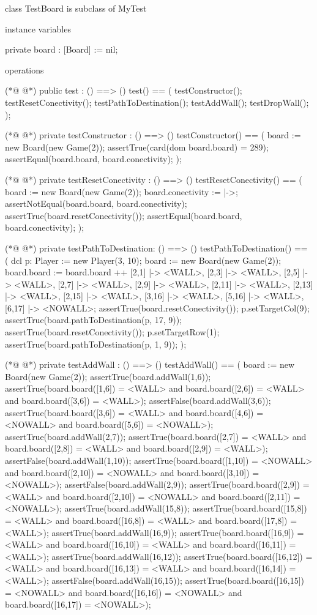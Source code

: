 \begin{vdmpp}[breaklines=true]
class TestBoard is subclass of MyTest

instance variables

 private board : [Board] := nil;
 
operations

(*@
\label{test:9}
@*)
 public test : () ==> ()
 test() ==
 (
  testConstructor();
  testResetConectivity();
  testPathToDestination();
  testAddWall();
  testDropWall();
 );
 
(*@
\label{testConstructor:19}
@*)
 private testConstructor : () ==> ()
 testConstructor() ==
 (
  board := new Board(new Game(2));
  assertTrue(card(dom board.board) = 289);
  assertEqual(board.board, board.conectivity);
 );

(*@
\label{testResetConectivity:27}
@*)
 private testResetConectivity : () ==> ()
 testResetConectivity() ==
 (
  board := new Board(new Game(2));
  board.conectivity := {|->};
  assertNotEqual(board.board, board.conectivity);
  assertTrue(board.resetConectivity());
  assertEqual(board.board, board.conectivity);
 );
 
(*@
\label{testPathToDestination:37}
@*)
 private testPathToDestination: () ==> ()
 testPathToDestination() ==
 (
  dcl
  p: Player := new Player(3, 10);
  board := new Board(new Game(2));
  board.board := board.board ++ {[2,1] |-> <WALL>, [2,3] |-> <WALL>, [2,5] |-> <WALL>, [2,7] |-> <WALL>, [2,9] |-> <WALL>, [2,11] |-> <WALL>, [2,13] |-> <WALL>, [2,15] |-> <WALL>, [3,16] |-> <WALL>, [5,16] |-> <WALL>, [6,17] |-> <NOWALL>};
  assertTrue(board.resetConectivity());
  p.setTargetCol(9);
  assertTrue(board.pathToDestination(p, 17, 9));
  assertTrue(board.resetConectivity());
  p.setTargetRow(1);
  assertTrue(board.pathToDestination(p, 1, 9));
 );
 
(*@
\label{testAddWall:52}
@*)
 private testAddWall : () ==> ()
 testAddWall() ==
 (
  board := new Board(new Game(2));
  assertTrue(board.addWall(1,6));
  assertTrue(board.board([1,6]) = <WALL> and board.board([2,6]) = <WALL> and board.board([3,6]) = <WALL>);
  assertFalse(board.addWall(3,6));
  assertTrue(board.board([3,6]) = <WALL> and board.board([4,6]) = <NOWALL> and board.board([5,6]) = <NOWALL>);
  assertTrue(board.addWall(2,7));
  assertTrue(board.board([2,7]) = <WALL> and board.board([2,8]) = <WALL> and board.board([2,9]) = <WALL>);
  assertFalse(board.addWall(1,10));
  assertTrue(board.board([1,10]) = <NOWALL> and board.board([2,10]) = <NOWALL> and board.board([3,10]) = <NOWALL>);
  assertFalse(board.addWall(2,9));
  assertTrue(board.board([2,9]) = <WALL> and board.board([2,10]) = <NOWALL> and board.board([2,11]) = <NOWALL>);
  assertTrue(board.addWall(15,8));
  assertTrue(board.board([15,8]) = <WALL> and board.board([16,8]) = <WALL> and board.board([17,8]) = <WALL>);
  assertTrue(board.addWall(16,9));
  assertTrue(board.board([16,9]) = <WALL> and board.board([16,10]) = <WALL> and board.board([16,11]) = <WALL>);
  assertTrue(board.addWall(16,12));
  assertTrue(board.board([16,12]) = <WALL> and board.board([16,13]) = <WALL> and board.board([16,14]) = <WALL>);
  assertFalse(board.addWall(16,15));
  assertTrue(board.board([16,15]) = <NOWALL> and board.board([16,16]) = <NOWALL> and board.board([16,17]) = <NOWALL>);
  

\end{vdmpp}
